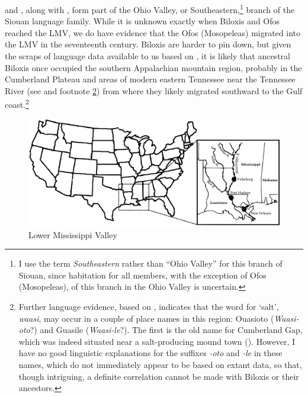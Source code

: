 \documentclass[output=paper]{LSP/langsci}
\begin{document}
 and , along with , form part of the Ohio Valley, or Southeastern,\footnote{I use the term \emph{Southeastern} rather than “Ohio Valley” for this branch of Siouan, since habitation for all members, with the exception of Ofos (Mosopeleas), of this branch in the Ohio Valley is uncertain.} branch of the Siouan language family. While it is unknown exactly when Biloxis and Ofos reached the LMV, we do have evidence that the Ofos (Mosopeleas) migrated into the LMV in the seventeenth century. Biloxis are harder to pin down, but given the scraps of language data available to us based on , it is likely that ancestral Biloxis once occupied the southern Appalachian mountain region, probably in the Cumberland Plateau and areas of modern eastern Tennessee near the Tennessee River (see \citealt{Rankin2011} and footnote \ref{waasi}) from where they likely migrated southward to the Gulf coast.\footnote{\label{waasi}Further language evidence, based on , indicates that the  word for `salt', \emph{waasi}, may occur in a couple of place names in this region: Ouasioto (\emph{Waasi-oto}?) and Guasile (\emph{Waasi-le}?). The first is the old name for Cumberland Gap, which was indeed situated near a salt-producing mound town (\citealt{Meyer1925}). However, I have no good linguistic explanations for the suffixes \emph{-oto} and \emph{-le} in these names, which do not immediately appear to be  based on extant data, so that, though intriguing, a definite correlation cannot be made with Biloxis or their ancestors.}


\begin{figure}
\caption{Lower Mississippi Valley} \label{map}
\includegraphics[width=12cm]{figures/Kaufman1}
\end{figure}
\end{document}

